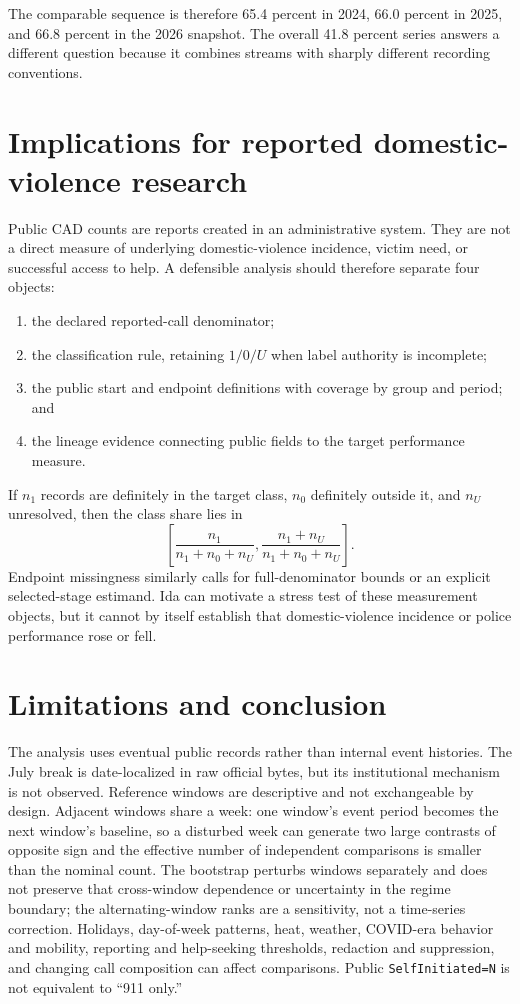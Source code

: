 \documentclass[11pt]{article}
\begin{document}
The comparable sequence is therefore 65.4 percent in 2024, 66.0 percent in 2025, and 66.8 percent in the 2026 snapshot. The overall 41.8 percent series answers a different question because it combines streams with sharply different recording conventions.

\section{Implications for reported domestic-violence research}

Public CAD counts are reports created in an administrative system. They are not a direct measure of underlying domestic-violence incidence, victim need, or successful access to help. A defensible analysis should therefore separate four objects:
\begin{enumerate}
\item the declared reported-call denominator;
\item the classification rule, retaining $1/0/U$ when label authority is incomplete;
\item the public start and endpoint definitions with coverage by group and period; and
\item the lineage evidence connecting public fields to the target performance measure.
\end{enumerate}

If $n_1$ records are definitely in the target class, $n_0$ definitely outside it, and $n_U$ unresolved, then the class share lies in
\begin{equation}
\left[\frac{n_1}{n_1+n_0+n_U},\frac{n_1+n_U}{n_1+n_0+n_U}\right].
\end{equation}
Endpoint missingness similarly calls for full-denominator bounds or an explicit selected-stage estimand. Ida can motivate a stress test of these measurement objects, but it cannot by itself establish that domestic-violence incidence or police performance rose or fell.

\section{Limitations and conclusion}

The analysis uses eventual public records rather than internal event histories. The July break is date-localized in raw official bytes, but its institutional mechanism is not observed. Reference windows are descriptive and not exchangeable by design. Adjacent windows share a week: one window's event period becomes the next window's baseline, so a disturbed week can generate two large contrasts of opposite sign and the effective number of independent comparisons is smaller than the nominal count. The bootstrap perturbs windows separately and does not preserve that cross-window dependence or uncertainty in the regime boundary; the alternating-window ranks are a sensitivity, not a time-series correction. Holidays, day-of-week patterns, heat, weather, COVID-era behavior and mobility, reporting and help-seeking thresholds, redaction and suppression, and changing call composition can affect comparisons. Public \texttt{SelfInitiated=N} is not equivalent to ``911 only.''
\end{document}
